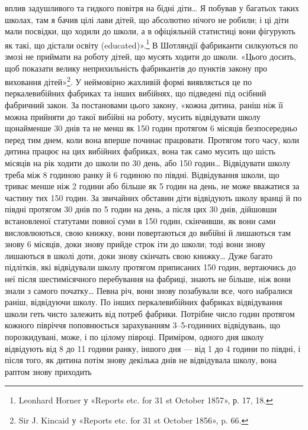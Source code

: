 \parcont{}  %
вплив задушливого та гидкого повітря на бідні діти\dots{} Я побував
у багатьох таких школах, там я бачив цілі лави дітей, що абсолютно
нічого не робили; і ці діти мали посвідки, що ходили до
школи, а в офіціяльній статистиці вони фігурують як такі, що
дістали освіту (educated)».\footnote{
Leonhard Horner у «Reports etc. for 31 st October 1857», р. 17, 18.
} В Шотляндії фабриканти силкуються
по змозі не приймати на роботу дітей, що мусять ходити до школи.
«Цього досить, щоб показати велику неприхильність фабрикантів
до пунктів закону про виховання дітей»\footnote{
Sir J. Kincaid у «Reports etc. for 31 st October 1856», p. 66.
}. У неймовірно
жахливій формі виявляється це по перкалевибійних фабриках та
інших вибійнях, що підведені під осібний фабричний закон.
За постановами цього закону, «кожна дитина, раніш ніж її можна
прийняти до такої вибійні на роботу, мусить відвідувати школу
щонайменше 30 днів та не менш як 150 годин протягом 6 місяців
безпосередньо перед тим днем, коли вона вперше починає працювати.
Протягом того часу, коли дитина працює на цих вибійних
фабриках, вона так само мусить що шість місяців на рік ходити
до школи по 30 день, або 150 годин\dots{} Відвідувати школу треба
між 8 годиною ранку й 6 годиною по півдні. Відвідування школи,
що триває менше ніж 2  години або більше як 5 годин на день,
не може вважатися за частину тих 150 годин. За звичайних обставин
діти відвідують школу вранці й по півдні протягом 30 днів
по 5 годин на день, а після цих 30 днів, дійшовши встановленої
статутами повної суми в 150 годин, скінчивши, як вони сами
висловлюються, свою книжку, вони повертаються до вибійні
й лишаються там знову 6 місяців, доки знову прийде строк іти
до школи; тоді вони знову лишаються в школі доти, доки знову
скінчать свою книжку\dots{} Дуже багато підлітків, які відвідували
школу протягом приписаних 150 годин, вертаючись до неї після
шестимісячного перебування на фабриці, знають не більше, ніж
вони знали з самого початку\dots{} Певна річ, вони знову позабували
все, чого набралися раніш, відвідуючи школу. По інших перкалевибійних
фабриках відвідування школи геть чисто залежить від
потреб фабрики. Потрібне число годин протягом кожного півріччя
поповнюється зарахуванням 3--5-годинних відвідувань, що порозкидувані,
може, і по цілому півроці. Приміром, одного дня
школу відвідують від 8 до 11 години ранку, іншого дня — від
1 до 4 години по півдні, і після того, як дитина потім знову декілька
днів не відвідувала школу, вона раптом знову приходить
